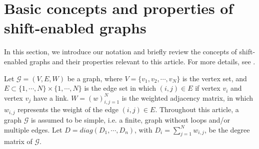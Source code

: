 \documentclass[journal]{IEEEtran}
\begin{document}



\section{Basic concepts and properties of shift-enabled graphs}
\label{sect:basicconcepts}
In this section, we introduce our notation and briefly review the concepts of shift-enabled graphs and their properties relevant to this article. For more details, see \cite{sandryhaila_2014_big_data,sandryhaila_2014_discrete_frequency, Shuman_2013_The_emerging_field,sandryhaila_2013_discrete}.


Let $\mathcal{G}=(V,E,W)$ be a graph, where $V=\{v_1,v_2,\cdots,v_{N}\}$ is the vertex set, and $E\subset\{1,\cdots,N\}\times\{1,\cdots, N\}$ is the edge set in which $(i,j)\in E$ if vertex $v_i$  and vertex $v_j$ have a link. $W=(w)_{i,j=1}^N$ is the weighted adjacency matrix, in which  $w_{i,j}$ represents the weight of the edge $(i,j)\in E$.
 Throughout this article, a graph $\mathcal{G}$ is assumed to be simple, i.e. a finite, graph without loops and/or multiple edges. 
Let $D=diag(D_1,\cdots,D_n)$, with $D_i=\sum_{j=1}^{N}w_{i,j}$, be the degree matrix of $\mathcal{G}$\cite{poignard2018spectra}.
\end{document}
